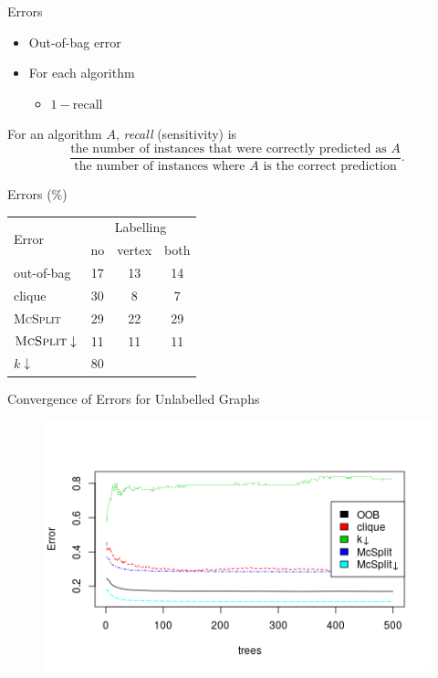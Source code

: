 \documentclass{beamer}
\begin{document}
\begin{frame}{Errors}
  \begin{itemize}
  \item Out-of-bag error
  \item For each algorithm
    \begin{itemize}
    \item $1 - \text{recall}$
    \end{itemize}
  \end{itemize}
  \begin{definition}
    For an algorithm $A$, \emph{recall} (sensitivity) is
    \[ \frac{\text{the number of instances that were correctly predicted as
          $A$}}{\text{the number of instances where $A$ is the correct
          prediction}}. \]
  \end{definition}
\end{frame}

\begin{frame}{Errors (\%)}
  \centering
  \begin{tabular}{l c c c}
    \toprule
    \multirow{2}{*}{Error} & \multicolumn{3}{c}{Labelling} \\
    \cmidrule(lr){2-4}
                           & no & vertex & both \\
    \midrule
    out-of-bag & 17 & 13 & 14 \\
    clique & 30 & 8 & 7 \\
    \textsc{McSplit} & 29 & 22 & 29 \\
    $\textsc{McSplit}\downarrow$ & 11 & 11 & 11 \\
    $k\downarrow$ & 80 & & \\
    \bottomrule
  \end{tabular}
\end{frame}

\begin{frame}{Convergence of Errors for Unlabelled Graphs}
  \begin{figure}
    \centering
    \includegraphics[scale=0.5]{../dissertation/images/unlabelled_forest_errors.png}
  \end{figure}
\end{frame}
\end{document}
